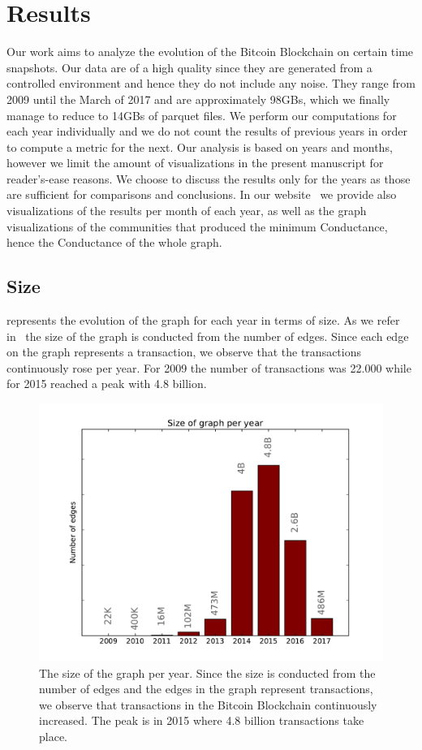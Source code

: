 \section{Results}
\label{sec:results} 

Our work aims to analyze the evolution of the Bitcoin Blockchain on certain
time snapshots. Our data are of a high quality since they are generated from a
controlled environment and hence they do not include any noise. They range from
2009 until the March of 2017 and are approximately 98GBs, which we finally
manage to reduce to 14GBs of parquet files. We perform our computations for
each year individually and we do not count the results of previous years in
order to compute a metric for the next. Our analysis is based on years and
months, however we limit the amount of visualizations in the present manuscript
for reader's-ease reasons. We choose to discuss the results only for the years
as those are sufficient for comparisons and conclusions. In our
website~\cite{website} we provide also visualizations of the results per month
of each year, as well as the graph visualizations of the communities that produced the 
minimum Conductance, hence the Conductance of the whole graph. 


\subsection{Size}
 represents the evolution of the graph for each year in terms of size. As we refer in~ the size of the graph is conducted from the number of edges. Since each edge on the graph represents a transaction, we observe that the transactions continuously rose per year.
For 2009 the number of transactions was 22.000 while for 2015 reached a peak with 4.8 billion.

\begin{figure}[h!]
\includegraphics[width=1\linewidth]{./images/size}
\centering
\caption{The size of the graph per year. Since the size is conducted from the number of edges and the edges in the graph represent transactions, we observe that transactions in the Bitcoin Blockchain continuously increased. The peak is in 2015 where 4.8 billion transactions take place.}
\label{fig:fig3}
\end{figure}


